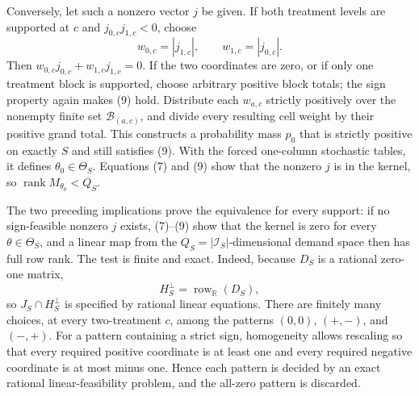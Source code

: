 Conversely, let such a nonzero vector \(j\) be given.  If both treatment levels are supported at \(c\) and \(j_{0,c}j_{1,c}<0\), choose
\[
w_{0,c}=|j_{1,c}|,
\qquad
w_{1,c}=|j_{0,c}|.
\tag{10}
\]
Then \(w_{0,c}j_{0,c}+w_{1,c}j_{1,c}=0\).  If the two coordinates are zero, or if only one treatment block is supported, choose arbitrary positive block totals; the sign property again makes (9) hold.  Distribute each \(w_{a,c}\) strictly positively over the nonempty finite set \(\mathcal B_{(a,c)}\), and divide every resulting cell weight by their positive grand total.  This constructs a probability mass \(p_0\) that is strictly positive on exactly \(S\) and still satisfies (9).  With the forced one-column stochastic tables, it defines \(\theta_0\in\Theta_S\).  Equations (7) and (9) show that the nonzero \(j\) is in the kernel, so \(\operatorname{rank}M_{\theta_0}<Q_S\).

The two preceding implications prove the equivalence for every support: if no sign-feasible nonzero \(j\) exists, (7)--(9) show that the kernel is zero for every \(\theta\in\Theta_S\), and a linear map from the \(Q_S=|\mathcal I_S|\)-dimensional demand space then has full row rank.  The test is finite and exact.  Indeed, because \(D_S\) is a rational zero-one matrix,
\[
H_S^\perp=\operatorname{row}_{\mathbb R}(D_S),
\tag{11}
\]
so \(J_S\cap H_S^\perp\) is specified by rational linear equations.  There are finitely many choices, at every two-treatment \(c\), among the patterns \((0,0)\), \((+,-)\), and \((-,+)\).  For a pattern containing a strict sign, homogeneity allows rescaling so that every required positive coordinate is at least one and every required negative coordinate is at most minus one.  Hence each pattern is decided by an exact rational linear-feasibility problem, and the all-zero pattern is discarded.

